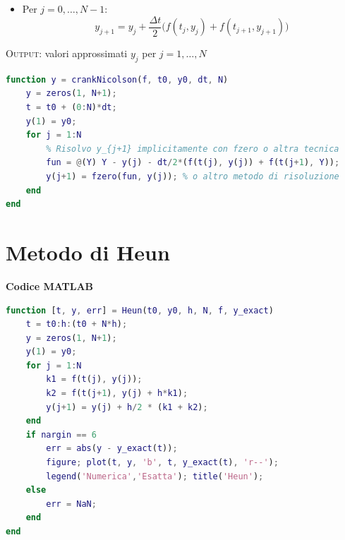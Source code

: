 \documentclass[12pt,a4paper]{article}
\begin{document}
\begin{flushleft}
\begin{flushleft}
{\begin{minipage}{\linewidth}
\begin{itemize}
\item Per \(j = 0, \dots, N-1\):
\[
y_{j+1} = y_j + \frac{\Delta t}{2} \big( f(t_j, y_j) + f(t_{j+1}, y_{j+1}) \big)
\]
\end{itemize}

\textsc{Output}: valori approssimati \(y_j\) per \(j=1,\dots,N\)
\end{minipage}
}
\end{flushleft}

\vspace{1em}

\begin{lstlisting}[language=Matlab]
function y = crankNicolson(f, t0, y0, dt, N)
    y = zeros(1, N+1);
    t = t0 + (0:N)*dt;
    y(1) = y0;
    for j = 1:N
        % Risolvo y_{j+1} implicitamente con fzero o altra tecnica
        fun = @(Y) Y - y(j) - dt/2*(f(t(j), y(j)) + f(t(j+1), Y));
        y(j+1) = fzero(fun, y(j)); % o altro metodo di risoluzione
    end
end
\end{lstlisting}

\vspace{1em}


\newpage

\section*{Metodo di Heun}

\begin{flushleft}
\end{flushleft}

\vspace{1em}

\textbf{Codice MATLAB}

\begin{lstlisting}[language=Matlab]
function [t, y, err] = Heun(t0, y0, h, N, f, y_exact)
    t = t0:h:(t0 + N*h);
    y = zeros(1, N+1);
    y(1) = y0;
    for j = 1:N
        k1 = f(t(j), y(j));
        k2 = f(t(j+1), y(j) + h*k1);
        y(j+1) = y(j) + h/2 * (k1 + k2);
    end
    if nargin == 6
        err = abs(y - y_exact(t));
        figure; plot(t, y, 'b', t, y_exact(t), 'r--');
        legend('Numerica','Esatta'); title('Heun');
    else
        err = NaN;
    end
end
\end{lstlisting}


\end{flushleft}
\end{document}
